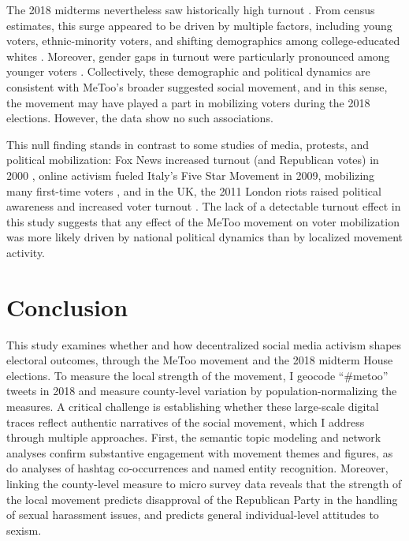 \documentclass[manuscript,screen,nonacm,11pt,acm]{acmart}
\begin{document}
The 2018 midterms nevertheless saw historically high turnout \citep{census2019turnout, brookings2019turnout, GalstonHendrickson2019}.
From census estimates, this surge appeared to be driven by multiple factors, including young voters, ethnic-minority voters, and shifting demographics among college-educated whites \citep{brookings2019turnout, census2019turnout}.
Moreover, gender gaps in turnout were particularly pronounced among younger voters \citep{census2019turnout}.
Collectively, these demographic and political dynamics are consistent with MeToo's broader suggested social movement, and in this sense, the movement may have played a part in mobilizing voters during the 2018 elections.
However, the data show no such associations.

This null finding stands in contrast to some studies of media, protests, and political mobilization:
Fox News increased turnout (and Republican votes) in 2000 \citep{DellaVigna2007}, online activism fueled Italy's Five Star Movement in 2009, mobilizing many first-time voters \citep{Campante2017}, and in the UK, the 2011 London riots raised political awareness and increased voter turnout \citep{leon2022}.
The lack of a detectable turnout effect in this study suggests that any effect of the MeToo movement on voter mobilization was more likely driven by national political dynamics than by localized movement activity.

\section{Conclusion}
\label{sec:conclusion}
This study examines whether and how decentralized social media activism shapes electoral outcomes, through the MeToo movement and the 2018 midterm House elections.
To measure the local strength of the movement, I geocode ``\#metoo'' tweets in 2018 and measure county-level variation by population-normalizing the measures.
A critical challenge is establishing whether these large-scale digital traces reflect authentic narratives of the social movement, which I address through multiple approaches.
First, the semantic topic modeling and network analyses confirm substantive engagement with movement themes and figures, as do analyses of hashtag co-occurrences and named entity recognition.
Moreover, linking the county-level measure to micro survey data reveals that the strength of the local movement predicts disapproval of the Republican Party in the handling of sexual harassment issues, and predicts general individual-level attitudes to sexism.
\end{document}
